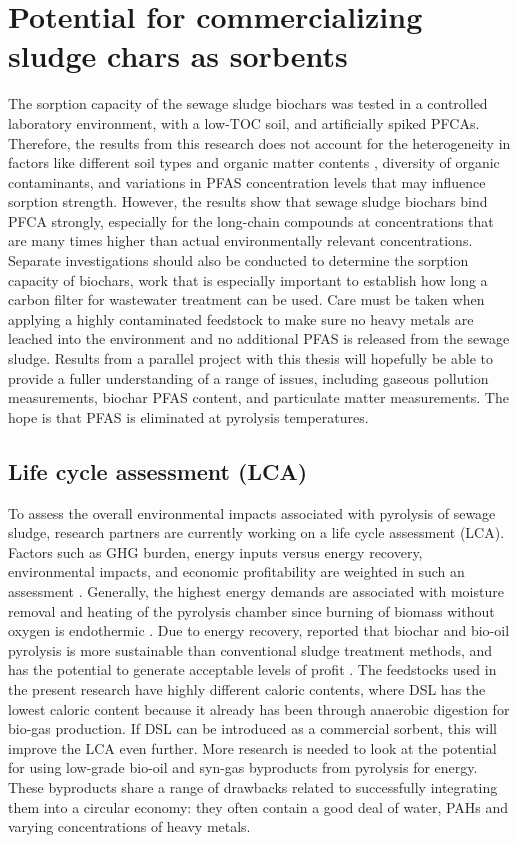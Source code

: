 \section{Potential for commercializing sludge chars as sorbents}
The sorption capacity of the sewage sludge biochars was tested in a controlled laboratory environment, with a low-TOC soil, and artificially spiked PFCAs. Therefore, the results from this research does not account for the heterogeneity in factors like different soil types and organic matter contents \citep{Sormo2021}, diversity of organic contaminants, and variations in PFAS concentration levels that may influence sorption strength. However, the results show that sewage sludge biochars bind PFCA strongly, especially for the long-chain compounds at concentrations that are many times higher than actual environmentally relevant concentrations. Separate investigations should also be conducted to determine the sorption capacity of biochars, work that is especially important to establish how long a carbon filter for wastewater treatment can be used. Care must be taken when applying a highly contaminated feedstock to make sure no heavy metals are leached into the environment and no additional PFAS is released from the sewage sludge. Results from a parallel project with this thesis will hopefully be able to provide a fuller understanding of a range of issues, including gaseous pollution measurements, biochar PFAS content, and particulate matter measurements. The hope is that PFAS is eliminated at pyrolysis temperatures.

\subsection{Life cycle assessment (LCA) \label{sec:LCA}}
To assess the overall environmental impacts associated with pyrolysis of sewage sludge, research partners are currently working on a life cycle assessment (LCA). Factors such as GHG burden, energy inputs versus energy recovery, environmental impacts, and economic profitability are weighted in such an assessment \citep{huang2022comparative}. Generally, the highest energy demands are associated with moisture removal and heating of the pyrolysis chamber since burning of biomass without oxygen is endothermic \citep{mcnamara2016pyrolysis}. Due to energy recovery, \cite{huang2022comparative} reported that biochar and bio-oil pyrolysis is more sustainable than conventional sludge treatment methods, and has the potential to generate acceptable levels of profit \cite{huang2022comparative}. The feedstocks used in the present research have highly different caloric contents, where DSL has the lowest caloric content because it already has been through anaerobic digestion for bio-gas production. If DSL can be introduced as a commercial sorbent, this will improve the LCA even further. More research is needed to look at the potential for using low-grade bio-oil and syn-gas byproducts from pyrolysis for energy. These byproducts share a range of drawbacks related to successfully integrating them into a circular economy: they often contain a good deal of water, PAHs and varying concentrations of heavy metals. 



 






